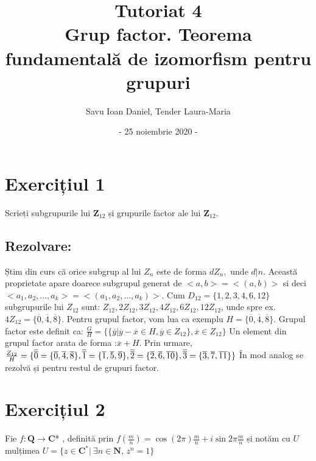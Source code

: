 \documentclass{article}
\title{Tutoriat 4 \\
\Large Grup factor. Teorema fundamentală de izomorfism pentru grupuri}
\date{- 25 noiembrie 2020 -}
\author{Savu Ioan Daniel, Tender Laura-Maria}
\begin{document}
\maketitle
\section{Exercițiul 1}
Scrieți subgrupurile lui $\mathbf{Z}_{12}$ și grupurile factor ale lui $\mathbf{Z}_{12}$.
\subsection{Rezolvare:}
Știm din curs că orice subgrup al lui $Z_n$ este de forma $dZ_n,$ unde $d | n$. Această proprietate apare doarece subgrupul generat de $<a,b> = <(a,b)>$ si deci $<a_1, a_2, ..., a_k> = <(a_1, a_2, ..., a_k)>$. Cum $D_{12} = \{1, 2, 3, 4, 6, 12\}$ subgrupurile lui $Z_{12}$ sunt: $Z_{12}, 2Z_{12}, 3Z_{12}, 4Z_{12}, 6Z_{12}, 12Z_{12}$, unde spre ex. $4Z_{12} = \{\overline{0}, \overline{4}, \overline{8}\}.$
\newline
Pentru grupul factor, vom lua ca exemplu $H=\{\overline{0}, \overline{4}, \overline{8}\}.$ Grupul factor este definit ca:
\newline
$\frac{G}{H} = \{\{\overline{y} | \overline{y} - \overline{x} \in H, \overline{y} \in Z_{12}\}, \overline{x} \in Z_{12}\}$ 
\newline
Un element din grupul factor arata de forma :$\overline{x} + H$.
\newline
Prin urmare, $\frac{Z_{12}}{H} = \{\\
\overline{\overline{0}}=\{\overline{0},\overline{4}, \overline{8}\},\\
\overline{\overline{1}}=\{\overline{1},\overline{5}, \overline{9}\},\\
\overline{\overline{2}}=\{\overline{2},\overline{6}, \overline{10}\},\\
\overline{\overline{3}}=\{\overline{3},\overline{7}, \overline{11}\} \\ \}
$
\newline
În mod analog se rezolvă și pentru restul de grupuri factor.

\section{Exercițiul 2}
Fie $f: \mathbf{Q} \rightarrow \mathbf{C}$* , definită prin $f(\frac{m}{n}) = \cos(2 \pi) \frac{m}{n} + i \sin 2 \pi \frac{m}{n}$ și notăm cu $U$ mulțimea $U = \{ z \in \mathbf{C}^* | \ \exists n \in \mathbf{N}, \, z^{n} = 1\}$
\end{document}
